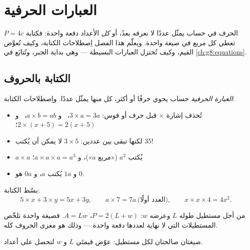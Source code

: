 \chapter{العبارات الحرفية}\label{ch:g7:literal}

الحرف في حساب يمثّل عددًا لا نعرفه بعدُ، أو
\emph{كل} الأعداد دفعة واحدة: فكتابة $P = 4c$ تعطي 
كل مربع في صيغة واحدة. ويعلّم هذا الفصل اِصطلاحات
الكتابة، وكيف تُعوَّض القيم، وكيف تُختزل العبارات
البسيطة --- وهي بداية الجبر، وتُتابَع في
\cref{ch:g8:equations}.

\section{الكتابة بالحروف}

\begin{definition}\label{def:g7:literal:def}
\emph{العبارة الحرفية} حساب
يحوي حرفًا أو أكثر، كل منها يمثّل عددًا. واِصطلاحات
الكتابة:
\begin{itemize}
  \item تُحذف إشارة $\times$ قبل حرف أو قوس:
        $3 \times a = 3a$، \ و $a \times b = ab$، \
        و $2 \times (x + 5) = 2(x + 5)$؛
  \item لكنها تبقى بين عددين:  $3 \times 5$ لا يمكن أن
        يُكتب $35$!
  \item {} $a \times a$ يُكتب $a^2$ («مربع $a$»)،
        و $a \times a \times a = a^3$؛
  \item و $1a$ يُكتب $a$، و $0a$ هو $0$.
\end{itemize}
\end{definition}

\begin{example}\label{ex:g7:literal:write}
بسّط الكتابة:
\[
5 \times x + 3 \times y = 5x + 3y,
\qquad
a \times 7 = 7a \ \text{(العدد أولًا)},
\qquad
x \times x \times 4 = 4x^2 .
\]
\end{example}

\begin{example}[الصيغ عبارات حرفية]\label{ex:g7:literal:formulas}
من أجل مستطيل طوله $L$ وعرضه $w$:
 $P = 2(L + w)$،  $A = Lw$. فصيغة واحدة تلخّص
المستطيلات التي لا نهاية لعددها دفعة واحدة --- وذلك هو مغزى
الحروف كله.
\end{example}

\begin{omfigure}

{\small صيغتان صالحتان لكل مستطيل: عوّض قيمتَي
$L$ و $w$ لتحصل على أعداد.}
\end{omfigure}

